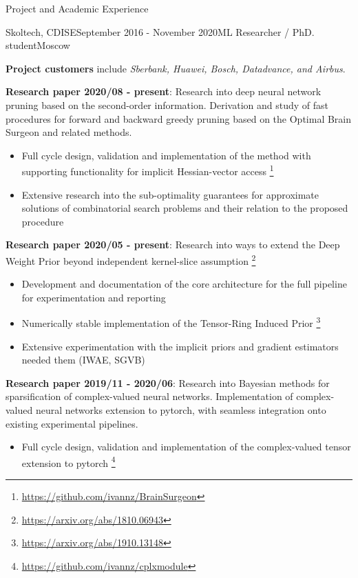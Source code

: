 \documentclass{resume} %
\begin{document}
\begin{rSection}{Project and Academic Experience}
\begin{rSubsection}{Skoltech, CDISE}{September 2016 - November 2020}{ML Researcher / PhD. student}{Moscow}
    \item \textbf{Project customers} include \emph{Sberbank, Huawei, Bosch, Datadvance, and Airbus}.

    \bigskip
    \item \textbf{Research paper 2020/08 - present}:
    Research into deep neural network pruning based on the second-order information.
    Derivation and study of fast procedures for forward and backward greedy pruning based
    on the Optimal Brain Surgeon and related methods.
    \begin{itemize}
        \item Full cycle design, validation and implementation of the method with supporting
        functionality for implicit Hessian-vector access%
            \footnote{\url{https://github.com/ivannz/BrainSurgeon}}

        \item Extensive research into the sub-optimality guarantees for approximate solutions
        of combinatorial search problems and their relation to the proposed procedure
    \end{itemize}

    \medskip
    \item \textbf{Research paper 2020/05 - present}:
    Research into ways to extend the Deep Weight Prior beyond independent kernel-slice assumption%
        \footnote{\url{https://arxiv.org/abs/1810.06943}}
    \begin{itemize}
        \item Development and documentation of the core architecture for the full pipeline for
        experimentation and reporting
        
        \item Numerically stable implementation of the Tensor-Ring Induced Prior%
            \footnote{\url{https://arxiv.org/abs/1910.13148}}
        
        \item Extensive experimentation with the implicit priors and gradient estimators
        needed them (IWAE, SGVB)
    \end{itemize}

    \medskip
    \item \textbf{Research paper 2019/11 - 2020/06}:
    Research into Bayesian methods for sparsification of complex-valued neural networks.
    Implementation of complex-valued neural networks extension to pytorch, with seamless
    integration onto existing experimental pipelines. \begin{itemize}
        \item Full cycle design, validation and implementation of the complex-valued tensor
        extension to pytorch%
            \footnote{\url{https://github.com/ivannz/cplxmodule}}
        

\end{itemize}
\end{rSubsection}
\end{rSection}
\end{document}
